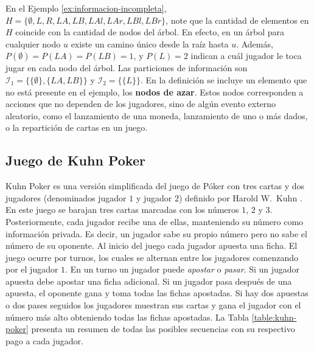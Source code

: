 En el Ejemplo \ref{ex:informacion-incompleta}, $H = \{ \emptyset, L, R, LA, LB, LAl, LAr, LBl, LBr\}$, note que la cantidad de elementos en $H$ coincide con la cantidad de nodos del árbol. En efecto, en un árbol para cualquier nodo $u$ existe un camino único desde la raíz hasta $u$. Además, $P(\emptyset) = P(LA) = P(LB) = 1$, y $P(L) = 2$ indican a cuál jugador le toca jugar en cada nodo del árbol. Las particiones de información son $\mathcal{I}_1 = \{\{\emptyset\}, \{LA, LB\}\}$ y $\mathcal{I}_2  = \{\{L\}\}$. En la definición se incluye un elemento que no está presente en el ejemplo, los \textbf{nodos de azar}. Estos nodos corresponden a acciones que no dependen de los jugadores, sino de algún evento externo aleatorio, como el lanzamiento de una moneda, lanzamiento de uno o más dados, o la repartición de cartas en un juego.

\subsection*{Juego de Kuhn Poker}
\label{section:kuhn-poker}

Kuhn Poker es una versión simplificada del juego de Póker con tres cartas y dos jugadores (denominados jugador $1$ y jugador $2$) definido por Harold W.\ Kuhn \cite{bib:kuhn-poker}. En este juego se barajan tres cartas marcadas con los números $1$, $2$ y $3$. Posteriormente, cada jugador recibe una de ellas, manteniendo su número como información privada. Es decir, un jugador sabe su propio número pero no sabe el número de su oponente. Al inicio del juego cada jugador apuesta una ficha. El juego ocurre por turnos, los cuales se alternan entre los jugadores comenzando por el jugador $1$. En un turno un jugador puede \textit{apostar} o \textit{pasar}. Si un jugador apuesta debe apostar una ficha adicional. Si un jugador pasa después de una apuesta, el oponente gana y toma todas las fichas apostadas. Si hay dos apuestas o dos pases seguidos los jugadores muestran sus cartas y gana el jugador con el número más alto obteniendo todas las fichas apostadas. La Tabla \ref{table:kuhn-poker} presenta un resumen de todas las posibles secuencias con su respectivo pago a cada jugador.

